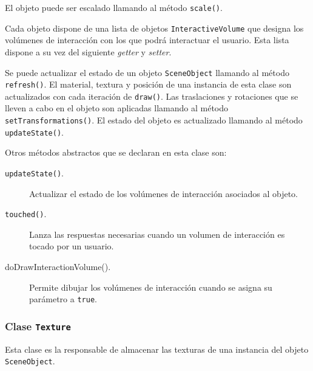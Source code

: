 \documentclass[10pt,a4paper]{report}
\begin{document}
	
	
	El objeto puede ser escalado llamando al método \texttt{scale()}.
	
	
	
	Cada objeto dispone de una lista de objetos \texttt{InteractiveVolume} que designa los volúmenes de interacción con los que podrá interactuar el usuario. Esta lista dispone a su vez del siguiente \textit{getter} y \textit{setter}.
	
	
	
	Se puede actualizar el estado de un objeto \texttt{SceneObject} llamando al método \texttt{refresh()}. El material, textura y posición de una instancia de esta clase son actualizados con cada iteración de \texttt{draw()}. Las traslaciones y rotaciones que se lleven a cabo en el objeto son aplicadas llamando al método \texttt{setTransformations()}. El estado del objeto es actualizado llamando al método \texttt{updateState()}.
	
	
	
	Otros métodos abstractos que se declaran en esta clase son:
	\begin{description}
		\item[\texttt{updateState()}.] Actualizar el estado de los volúmenes de interacción asociados al objeto.
		\item[\texttt{touched()}.] Lanza las respuestas necesarias cuando un volumen de interacción es tocado por un usuario.
		\item[doDrawInteractionVolume().] Permite dibujar los volúmenes de interacción cuando se asigna su parámetro a \texttt{true}.
		\end{description}	
	
	 
	
	\subsubsection{Clase \texttt{Texture}}
	Esta clase es la responsable de almacenar las texturas de una instancia del objeto \texttt{SceneObject}.
	
	
	
\end{document}
